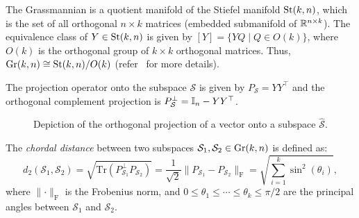 The Grassmannian is a quotient manifold of the Stiefel manifold $\text{St}(k,n)$, which is the set of all orthogonal $n \times k$ matrices (embedded submanifold of $\mathbb{R}^{n \times k}$). The equivalence class of $Y \in \text{St}(k,n)$ is given by $[Y] = \{ Y Q \mid Q \in O(k) \}$, where $O(k)$ is the orthogonal group of $k \times k$ orthogonal matrices. Thus, $\text{Gr}(k,n) \cong \text{St}(k,n) / O(k)$ (refer~\cite{boumal2023} for more details).

The projection operator onto the subspace $\mathcal{S}$ is given by $P_{\mathcal{S}} = Y Y^\top$ and the orthogonal complement projection is $P_{\mathcal{S}}^{\perp} = \mathbb{I}_n - Y Y^\top$.

\begin{figure}[h]
    \centering
{}
\caption{Depiction of the orthogonal projection of a vector onto a subspace $\hat{\mathcal{S}}$.}
\end{figure}

\begin{definition}\label{defn:chordal}
    The \textit{chordal distance} between two subspaces $\mathcal{S}_1, \mathcal{S}_2 \in \text{Gr}(k,n)$ is defined as:
    \[
        d_{2}(\mathcal{S}_1, \mathcal{S}_2) = \sqrt{\mathrm{Tr}\left(P_{\mathcal{S}_1}^\perp P_{\mathcal{S}_2}\right)} = \frac{1}{\sqrt{2}}\lVert P_{\mathcal{S}_1} - P_{\mathcal{S}_2} \rVert_{\mathrm{F}} = \sqrt{\sum_{i=1}^{k} \sin^2(\theta_i)},
    \]
    where $\lVert \cdot \rVert_{\mathrm{F}}$ is the Frobenius norm, and $0 \leq \theta_1 \leq \cdots \leq \theta_k \leq \pi/2$ are the principal angles between $\mathcal{S}_1$ and $\mathcal{S}_2$.
    
\end{definition}

